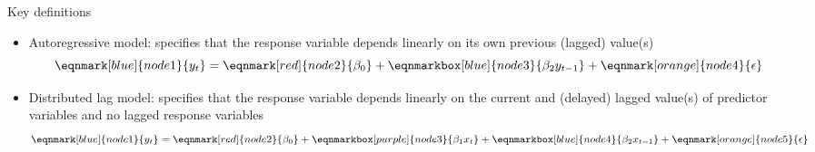 \documentclass[english]{beamer}
\newcommand{\alertblue}[1]{{\color{blue}#1}}
\begin{document}
\begin{frame}{Key definitions}
    \begin{itemize}
        \item \alertblue{Autoregressive model}: specifies that the \alertblue{response} variable depends linearly on its own previous (\alertblue{lagged}) value(s)
        \begin{equation*}
            \eqnmark[blue]{node1}{y_t}=
            \eqnmark[red]{node2}{\beta_0} +
            \eqnmarkbox[blue]{node3}{\beta_2 y_{t - 1}} + 
            \eqnmark[orange]{node4}{\epsilon}
        \end{equation*}
        \vspace{0.3cm}
        \item \alertblue{Distributed lag model}: specifies that the \alertblue{response} variable depends linearly on the current and (\alertblue{delayed}) lagged value(s) of predictor variables and \alert {no lagged response variables} 
        \begin{equation*}
            \eqnmark[blue]{node1}{y_t}=
            \eqnmark[red]{node2}{\beta_0} +
            \eqnmarkbox[purple]{node3}{\beta_1 x_t} + 
            \eqnmarkbox[blue]{node4}{\beta_2 x_{t-1}} + 
            \eqnmark[orange]{node5}{\epsilon}
        \end{equation*}
    \end{itemize}
\end{frame}
\end{document}
